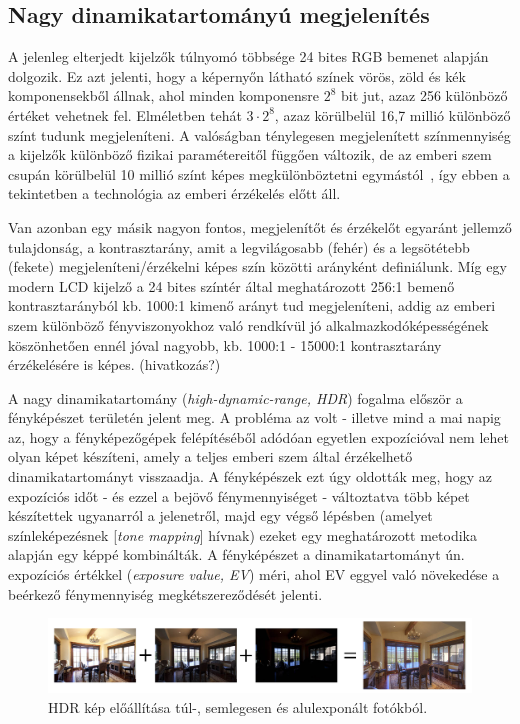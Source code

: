 \subsection{Nagy dinamikatartományú megjelenítés}

A jelenleg elterjedt kijelzők túlnyomó többsége 24 bites RGB bemenet alapján dolgozik. Ez azt jelenti, hogy a képernyőn látható színek vörös, zöld és kék komponensekből állnak, ahol minden komponensre \(2^8\) bit jut, azaz 256 különböző értéket vehetnek fel. Elméletben tehát \(3 \cdot 2^8\), azaz körülbelül 16,7 millió különböző színt tudunk megjeleníteni. A valóságban ténylegesen megjelenített színmennyiség a kijelzők különböző fizikai paramétereitől függően változik, de az emberi szem csupán körülbelül 10 millió színt képes megkülönböztetni egymástól~\cite{judd1975color}, így ebben a tekintetben a technológia az emberi érzékelés előtt áll.

Van azonban egy másik nagyon fontos, megjelenítőt és érzékelőt egyaránt jellemző tulajdonság, a kontrasztarány, amit a legvilágosabb (fehér) és a legsötétebb (fekete) megjeleníteni/érzékelni képes szín közötti arányként definiálunk. Míg egy modern LCD kijelző a 24 bites színtér által meghatározott 256:1 bemenő kontrasztarányból kb. 1000:1 kimenő arányt tud megjeleníteni, addig az emberi szem különböző fényviszonyokhoz való rendkívül jó alkalmazkodóképességének köszönhetően ennél jóval nagyobb, kb. 1000:1 - 15000:1 kontrasztarány érzékelésére is képes. (hivatkozás?)

A nagy dinamikatartomány (\textit{high-dynamic-range, HDR}) fogalma először a fényképészet területén jelent meg. A probléma az volt - illetve mind a mai napig az, hogy a fényképezőgépek felépítéséből adódóan egyetlen expozícióval nem lehet olyan képet készíteni, amely a teljes emberi szem által érzékelhető dinamikatartományt visszaadja. A fényképészek ezt úgy oldották meg, hogy az expozíciós időt - és ezzel a bejövő fénymennyiséget - változtatva több képet készítettek ugyanarról a jelenetről, majd egy végső lépésben (amelyet színleképezésnek [\textit{tone mapping}] hívnak) ezeket egy meghatározott metodika alapján egy képpé kombinálták. A fényképészet a dinamikatartományt ún. expozíciós értékkel (\textit{exposure value, EV}) méri, ahol EV eggyel való növekedése a beérkező fénymennyiség megkétszereződését jelenti.

\begin{figure}[!ht]
    \centering
    \includegraphics[width=1.0\textwidth]{images/hdr_process.png}
    \caption{HDR kép előállítása túl-, semlegesen és alulexponált fotókból.}
\end{figure}

